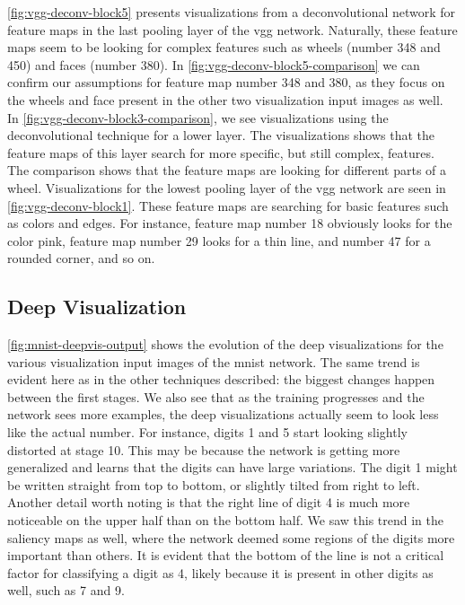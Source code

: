 \noindent \autoref{fig:vgg-deconv-block5} presents visualizations from a deconvolutional network for feature maps in the last pooling layer of the \acrshort{vgg} network. Naturally, these feature maps seem to be looking for complex features such as wheels (number 348 and 450) and faces (number 380). In \autoref{fig:vgg-deconv-block5-comparison} we can confirm our assumptions for feature map number 348 and 380, as they focus on the wheels and face present in the other two visualization input images as well. \\

\noindent In \autoref{fig:vgg-deconv-block3-comparison}, we see visualizations using the deconvolutional technique for a lower layer. The visualizations shows that the feature maps of this layer search for more specific, but still complex, features. The comparison shows that the feature maps are looking for different parts of a wheel. Visualizations for the lowest pooling layer of the \acrshort{vgg} network are seen in \autoref{fig:vgg-deconv-block1}. These feature maps are searching for basic features such as colors and edges. For instance, feature map number 18 obviously looks for the color pink, feature map number 29 looks for a thin line, and number 47 for a rounded corner, and so on. 

\subsection{Deep Visualization}

\autoref{fig:mnist-deepvis-output} shows the evolution of the deep visualizations for the various visualization input images of the \acrshort{mnist} network. The same trend is evident here as in the other techniques described: the biggest changes happen between the first stages. We also see that as the training progresses and the network sees more examples, the deep visualizations actually seem to look less like the actual number. For instance, digits 1 and 5 start looking slightly distorted at stage 10. This may be because the network is getting more generalized and learns that the digits can have large variations. The digit 1 might be written straight from top to bottom, or slightly tilted from right to left. Another detail worth noting is that the right line of digit 4 is much more noticeable on the upper half than on the bottom half. We saw this trend in the saliency maps as well, where the network deemed some regions of the digits more important than others. It is evident that the bottom of the line is not a critical factor for classifying a digit as 4, likely because it is present in other digits as well, such as 7 and 9.\\

